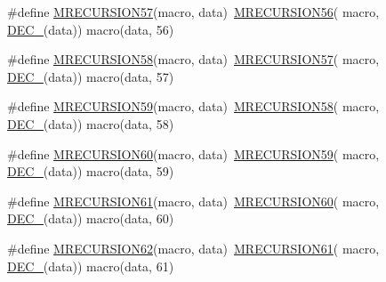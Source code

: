 \begin{DoxyCompactItemize}
\item 
\#define \mbox{\hyperlink{group__group__sam0__utils__mrecursion_ga701249519fa778a36982d5e3079aed83}{M\+R\+E\+C\+U\+R\+S\+I\+O\+N57}}(macro,  data)~\mbox{\hyperlink{group__group__sam0__utils__mrecursion_ga1899efaf30176f2ad8b7b1e22b2564c5}{M\+R\+E\+C\+U\+R\+S\+I\+O\+N56}}(  macro, \mbox{\hyperlink{group__group__sam0__utils__mrecursion_ga1d23d683797679dca8c3512a54a5dcae}{D\+E\+C\+\_\+}}(data))   macro(data, 56)
\item 
\#define \mbox{\hyperlink{group__group__sam0__utils__mrecursion_gad03d64f80b3b5e94dd9e1d3a2e1e2feb}{M\+R\+E\+C\+U\+R\+S\+I\+O\+N58}}(macro,  data)~\mbox{\hyperlink{group__group__sam0__utils__mrecursion_ga701249519fa778a36982d5e3079aed83}{M\+R\+E\+C\+U\+R\+S\+I\+O\+N57}}(  macro, \mbox{\hyperlink{group__group__sam0__utils__mrecursion_ga1d23d683797679dca8c3512a54a5dcae}{D\+E\+C\+\_\+}}(data))   macro(data, 57)
\item 
\#define \mbox{\hyperlink{group__group__sam0__utils__mrecursion_gad8878230dd012dbaabd3e2b8a309fafb}{M\+R\+E\+C\+U\+R\+S\+I\+O\+N59}}(macro,  data)~\mbox{\hyperlink{group__group__sam0__utils__mrecursion_gad03d64f80b3b5e94dd9e1d3a2e1e2feb}{M\+R\+E\+C\+U\+R\+S\+I\+O\+N58}}(  macro, \mbox{\hyperlink{group__group__sam0__utils__mrecursion_ga1d23d683797679dca8c3512a54a5dcae}{D\+E\+C\+\_\+}}(data))   macro(data, 58)
\item 
\#define \mbox{\hyperlink{group__group__sam0__utils__mrecursion_gae264d2df1687efc33a4381c9dea0f925}{M\+R\+E\+C\+U\+R\+S\+I\+O\+N60}}(macro,  data)~\mbox{\hyperlink{group__group__sam0__utils__mrecursion_gad8878230dd012dbaabd3e2b8a309fafb}{M\+R\+E\+C\+U\+R\+S\+I\+O\+N59}}(  macro, \mbox{\hyperlink{group__group__sam0__utils__mrecursion_ga1d23d683797679dca8c3512a54a5dcae}{D\+E\+C\+\_\+}}(data))   macro(data, 59)
\item 
\#define \mbox{\hyperlink{group__group__sam0__utils__mrecursion_ga9ee049c290930ecf8675806b5cdb8266}{M\+R\+E\+C\+U\+R\+S\+I\+O\+N61}}(macro,  data)~\mbox{\hyperlink{group__group__sam0__utils__mrecursion_gae264d2df1687efc33a4381c9dea0f925}{M\+R\+E\+C\+U\+R\+S\+I\+O\+N60}}(  macro, \mbox{\hyperlink{group__group__sam0__utils__mrecursion_ga1d23d683797679dca8c3512a54a5dcae}{D\+E\+C\+\_\+}}(data))   macro(data, 60)
\item 
\#define \mbox{\hyperlink{group__group__sam0__utils__mrecursion_ga6e6d5152fa7a0cb287f6df4c79043ef1}{M\+R\+E\+C\+U\+R\+S\+I\+O\+N62}}(macro,  data)~\mbox{\hyperlink{group__group__sam0__utils__mrecursion_ga9ee049c290930ecf8675806b5cdb8266}{M\+R\+E\+C\+U\+R\+S\+I\+O\+N61}}(  macro, \mbox{\hyperlink{group__group__sam0__utils__mrecursion_ga1d23d683797679dca8c3512a54a5dcae}{D\+E\+C\+\_\+}}(data))   macro(data, 61)

\end{DoxyCompactItemize}
